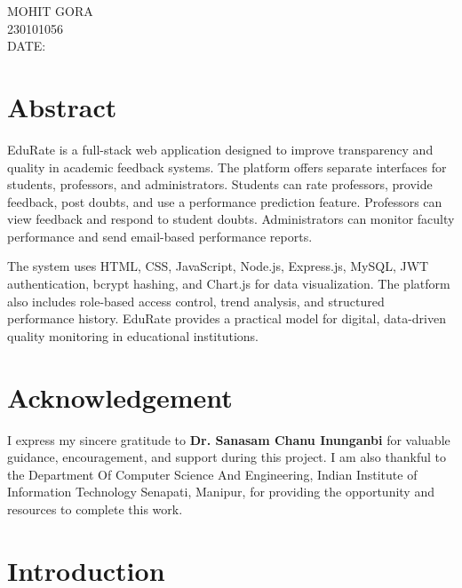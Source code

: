 \documentclass[a4paper,12pt,oneside]{report}
\begin{document}
\vspace{1cm}\hspace{8.2cm} MOHIT GORA \\
\vspace{0.5cm}\hspace{8.2cm} 230101056 \\
\vspace{0.5cm} DATE: \underline{\hspace{3cm}}

\newpage

\chapter*{Abstract}
EduRate is a full-stack web application designed to improve transparency and quality in academic feedback systems. The platform offers separate interfaces for students, professors, and administrators. Students can rate professors, provide feedback, post doubts, and use a performance prediction feature. Professors can view feedback and respond to student doubts. Administrators can monitor faculty performance and send email-based performance reports.

The system uses HTML, CSS, JavaScript, Node.js, Express.js, MySQL, JWT authentication, bcrypt hashing, and Chart.js for data visualization. The platform also includes role-based access control, trend analysis, and structured performance history. EduRate provides a practical model for digital, data-driven quality monitoring in educational institutions.

\newpage

\chapter*{Acknowledgement}
I express my sincere gratitude to \textbf{Dr. Sanasam Chanu Inunganbi} for valuable guidance, encouragement, and support during this project. I am also thankful to the Department Of Computer Science And Engineering, Indian Institute of Information Technology Senapati, Manipur, for providing the opportunity and resources to complete this work.

\tableofcontents
\listoffigures
\newpage

\chapter{Introduction}

\end{document}
